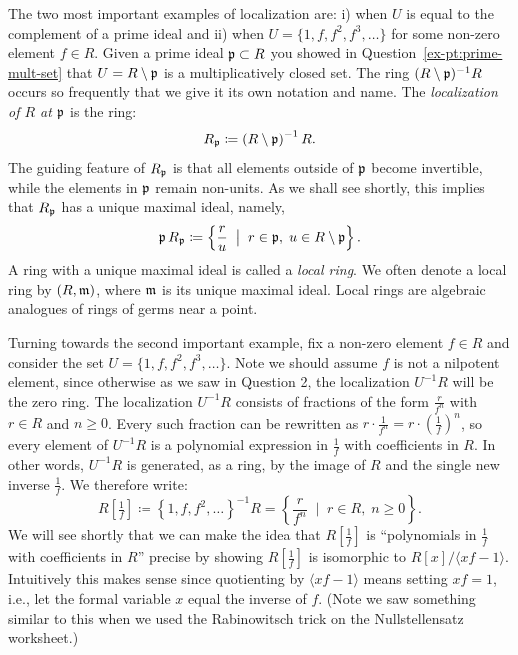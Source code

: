 \documentclass[Notebook.tex]{subfiles}
\begin{document}
The two most important examples of localization are: i) when $U$ is equal to the complement of a prime ideal and ii) when $U=\{1,f,f^2,f^3,\ldots\}$ for some non-zero element $f\in R$. Given a prime ideal $\operatorname{\mathfrak{p}} \subset R$ you showed in Question~\ref{ex-pt:prime-mult-set} that $U=R \setminus \operatorname{\mathfrak{p}}$ is a multiplicatively closed set. The ring $(R\setminus \operatorname{\mathfrak{p}})^{-1}R$ occurs so frequently that we give it its own notation and name. The \emph{localization of $R$ at $\operatorname{\mathfrak{p}}$} is the ring:
\[
R_{\operatorname{\mathfrak{p}}} \coloneqq \left(R\setminus\operatorname{\mathfrak{p}}\right)^{-1}R.
\]
The guiding feature of $R_{\operatorname{\mathfrak{p}}}$ is that all elements outside of $\operatorname{\mathfrak{p}}$ become invertible, while the elements in $\operatorname{\mathfrak{p}}$ remain non-units. As we shall see shortly, this implies that $R_{\operatorname{\mathfrak{p}}}$ has a unique maximal ideal, namely,
\[
\operatorname{\mathfrak{p}} R_{\operatorname{\mathfrak{p}}} \coloneqq \left\{ \frac{r}{u} \;\; \big|\;\; r \in \operatorname{\mathfrak{p}},\; u\in R\setminus \operatorname{\mathfrak{p}}\right\}.
\]
A ring with a unique maximal ideal is called a \emph{local ring}. We often denote a local ring by $(R,\operatorname{\mathfrak{m}})$, where $\operatorname{\mathfrak{m}}$ is its unique maximal ideal. Local rings are algebraic analogues of rings of germs near a point.

Turning towards the second important example, fix a non-zero element $f \in R$ and consider the set $U = \{1, f, f^2, f^3, \ldots\}$. Note we should assume $f$ is not a nilpotent element, since otherwise as we saw in Question 2, the localization $U^{-1}R$ will be the zero ring. The localization $U^{-1}R$ consists of fractions of the form $\frac{r}{f^n}$ with $r \in R$ and $n \geq 0$. Every such fraction can be rewritten as $r \cdot \frac{1}{f^n} = r \cdot \left(\frac{1}{f}\right)^n$, so every element of $U^{-1}R$ is a polynomial expression in $\frac{1}{f}$ with coefficients in $R$. In other words, $U^{-1}R$ is generated, as a ring, by the image of $R$ and the single new inverse $\frac{1}{f}$. We therefore write:
\[
R\left[\tfrac{1}{f}\right] \coloneqq \left\{1, f, f^2, \ldots\right\}^{-1}R = \left\{ \frac{r}{f^n} \;\;\big|\;\; r \in R,\; n \geq 0 \right\}.
\]
We will see shortly that we can make the idea that $R[\frac{1}{f}]$ is  ``polynomials in $\frac{1}{f}$ with coefficients in $R$'' precise by showing $R[\frac{1}{f}]$ is isomorphic to $R[x]/\langle xf-1\rangle$. Intuitively this makes sense since quotienting by $\langle xf-1\rangle$ means setting $xf=1$, i.e., let the formal variable $x$ equal the inverse of $f$. (Note we saw something similar to this when we used the Rabinowitsch trick on the Nullstellensatz worksheet.)

\hrulefill

\newpage
\end{document}
